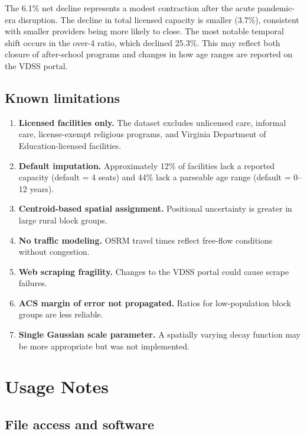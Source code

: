 \documentclass{CUP-JNL-DAP}%
\begin{document}
The 6.1\% net decline represents a modest contraction after the acute pandemic-era disruption. The decline in total licensed capacity is smaller (3.7\%), consistent with smaller providers being more likely to close. The most notable temporal shift occurs in the over-4 ratio, which declined 25.3\%. This may reflect both closure of after-school programs and changes in how age ranges are reported on the VDSS portal.

\subsection{Known limitations}

\begin{enumerate}
\item \textbf{Licensed facilities only.} The dataset excludes unlicensed care, informal care, license-exempt religious programs, and Virginia Department of Education-licensed facilities.
\item \textbf{Default imputation.} Approximately 12\% of facilities lack a reported capacity (default = 4 seats) and 44\% lack a parseable age range (default = 0--12 years).
\item \textbf{Centroid-based spatial assignment.} Positional uncertainty is greater in large rural block groups.
\item \textbf{No traffic modeling.} OSRM travel times reflect free-flow conditions without congestion.
\item \textbf{Web scraping fragility.} Changes to the VDSS portal could cause scrape failures.
\item \textbf{ACS margin of error not propagated.} Ratios for low-population block groups are less reliable.
\item \textbf{Single Gaussian scale parameter.} A spatially varying decay function may be more appropriate but was not implemented.
\end{enumerate}


\section{Usage Notes}

\subsection{File access and software}
\end{document}
